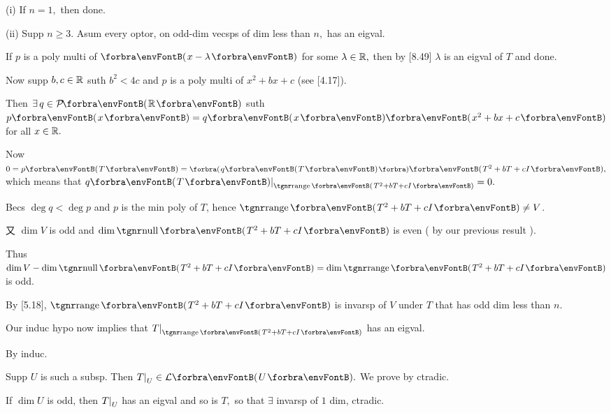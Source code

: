 \par\quad
(i) If $n=1,$ then done.\par\quad\Endi
(ii) Supp $n\geqslant 3.$ Asum every optor, on odd-dim vecsps of dim less than $n,$ has an eigval.\par\quad\Hii
If $p$ is a poly multi of $\Par{x - \lambda}$ for some $\lambda\in{\mathbb{R}},$ then by [8.49] $\lambda$ is an eigval of $T$ and done.\par\quad\Hii
Now supp $b, c\in{\mathbb{R}}$ suth $b^2 < 4c$ and $p$ is a poly multi of $x^2 + bx + c$ (see [4.17]).\par\quad\Hii
Then $\exists\,q\in\PoRi$ suth $p\Par{x} = q\Par{x}\Par{x^2 + bx + c}$ for all $x\in{\mathbb{R}}.$\par\quad\Hii
Now $0 = p\Par{T} = \BigPar{q\Par{T}}\Par{T^2 + bT + cI},$ which means that $q\Par{T}\mmid_{\range\Par{T^2+bT+cI}}=0.$\par\quad\Hii
Becs $\deg q < \deg p$ and $p$ is the min poly of $T$, hence $\range\Par{T^2 + bT + cI}\neq V$.\par\quad\Hii
又 $\dim V$ is odd and $\dim\null\Par{T^2 +bT+cI}$ is even ( by our previous result ).\par\quad\Hii
Thus $\dim V - \dim \null\Par{T^2 + bT + cI}=\dim \range\Par{T^2 + bT + cI}$ is odd.\par\quad\Hii
By [5.18], $\range\Par{T^2 + bT + cI}$ is invarsp of $V$ under $T$ that has odd dim less than $n.$\par\quad\Hii
Our induc hypo now implies that $T\mmid_{\range\Par{T^2 + bT + cI}}$ has an eigval.\par\quad
By induc.\PfEnd
\SepLine

\par\quad
Supp $U$ is such a subsp. Then $T\mmid_U\in\Lm{U}.$
We prove by ctradic.\par\quad
If $\dim U$ is odd, then $T\text{\normalsize|}_U$ has an eigval and so is $T,$ so that $\exists$ invarsp of $1$ dim, ctradic.\PfEnd
\SepLine

